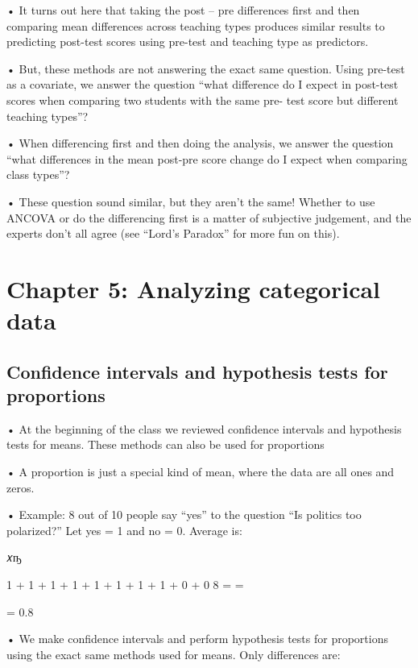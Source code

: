 \documentclass[
  letterpaper,
  DIV=11,
  numbers=noendperiod]{scrreprt}
\begin{document}
• It turns out here that taking the post -- pre differences first and
then comparing mean differences across teaching types produces similar
results to predicting post-test scores using pre-test and teaching type
as predictors.

• But, these methods are not answering the exact same question. Using
pre-test as a covariate, we answer the question ``what difference do I
expect in post-test scores when comparing two students with the same
pre- test score but different teaching types''?

• When differencing first and then doing the analysis, we answer the
question ``what differences in the mean post-pre score change do I
expect when comparing class types''?

• These question sound similar, but they aren't the same! Whether to use
ANCOVA or do the differencing first is a matter of subjective judgement,
and the experts don't all agree (see ``Lord's Paradox'' for more fun on
this).


\hypertarget{chapter-5-analyzing-categorical-data}{%
\chapter{Chapter 5: Analyzing categorical
data}\label{chapter-5-analyzing-categorical-data}}

\hypertarget{confidence-intervals-and-hypothesis-tests-for-proportions}{%
\section{Confidence intervals and hypothesis tests for
proportions}\label{confidence-intervals-and-hypothesis-tests-for-proportions}}

• At the beginning of the class we reviewed confidence intervals and
hypothesis tests for means. These methods can also be used for
proportions

• A proportion is just a special kind of mean, where the data are all
ones and zeros.

• Example: 8 out of 10 people say ``yes'' to the question ``Is politics
too polarized?'' Let yes = 1 and no = 0. Average is:

𝑥ҧ

1 + 1 + 1 + 1 + 1 + 1 + 1 + 1 + 0 + 0 8 = =

= 0.8

• We make confidence intervals and perform hypothesis tests for
proportions using the exact same methods used for means. Only
differences are:
\end{document}
